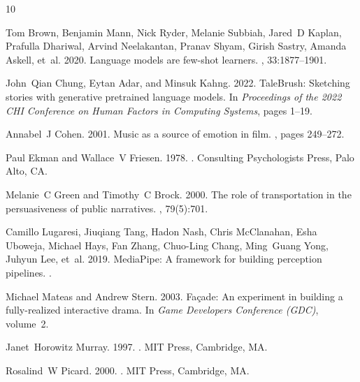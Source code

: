 \documentclass[sigconf,nonacm]{acmart}
\begin{document}
\begin{thebibliography}{10}

Tom Brown, Benjamin Mann, Nick Ryder, Melanie Subbiah, Jared~D Kaplan, Prafulla Dhariwal, Arvind Neelakantan, Pranav Shyam, Girish Sastry, Amanda Askell, et~al. 2020.
\newblock Language models are few-shot learners.
, 33:1877--1901.

John~Qian Chung, Eytan Adar, and Minsuk Kahng. 2022.
\newblock TaleBrush: Sketching stories with generative pretrained language models.
\newblock In {\em Proceedings of the 2022 CHI Conference on Human Factors in Computing Systems}, pages 1--19.

Annabel~J Cohen. 2001.
\newblock Music as a source of emotion in film.
, pages 249--272.

Paul Ekman and Wallace~V Friesen. 1978.
.
\newblock Consulting Psychologists Press, Palo Alto, CA.

Melanie~C Green and Timothy~C Brock. 2000.
\newblock The role of transportation in the persuasiveness of public narratives.
, 79(5):701.

Camillo Lugaresi, Jiuqiang Tang, Hadon Nash, Chris McClanahan, Esha Uboweja, Michael Hays, Fan Zhang, Chuo-Ling Chang, Ming~Guang Yong, Juhyun Lee, et~al. 2019.
\newblock MediaPipe: A framework for building perception pipelines.
.

Michael Mateas and Andrew Stern. 2003.
\newblock Fa{\c{c}}ade: An experiment in building a fully-realized interactive drama.
\newblock In {\em Game Developers Conference (GDC)}, volume~2.

Janet~Horowitz Murray. 1997.
.
\newblock MIT Press, Cambridge, MA.

Rosalind~W Picard. 2000.
.
\newblock MIT Press, Cambridge, MA.


\end{thebibliography}
\end{document}
